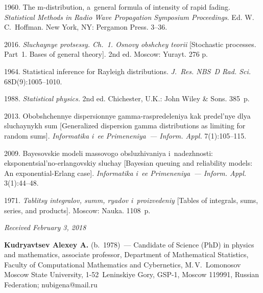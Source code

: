 \begin{multicols}{2}
{{\begin{thebibliography}{99}
 1960. The m-distribution, a~general formula of intensity of 
rapid fading. \textit{Statistical Methods in Radio Wave Propagation 
Symposium Proceedings}. Ed. W.\,C.~Hoffman. 
New York, NY: Pergamon Press. 3--36.

 2016. 
\textit{Sluchaynye protsessy. Ch.~1. Osnovy obshchey teorii} 
[Stochastic processes. Part~1. Bases of general theory].   
2nd ed.  Moscow: Yurayt. 276 p.

 1964. 
Statistical inference for Rayleigh distributions. 
\textit{J.~Res. NBS~D Rad. Sci.}
68D(9):1005--1010.

 1988. 
\textit{Statistical physics.} 2nd ed.  Chichester, U.K.: John Wiley \& Sons. 385~p.

 2013. 
Obobshchennye dispersionnye gamma-raspredeleniya kak predel'nye 
dlya sluchaynykh sum [Generalized dispersion gamma distributions 
as limiting for random sums]. 
\textit{Informatika i~ee Primeneniya~--- Inform. Appl.} 7(1):105--115.

 2009. 
Bayesovskie modeli massovogo obsluzhivaniya i~nadezhnosti: 
eksponentsial'no-erlangovskiy sluchay [Bayesian queuing and reliability models:
An exponential-Erlang case]. 
\textit{Informatika i~ee Primeneniya~--- Inform. Appl.} 3(1):44--48.

 1971. 
\textit{Tablitsy integralov, summ, ryadov i~proizvedeniy} 
[Tables of integrals, sums, series, and products]. Moscow: Nauka. 1108~p.
 \end{thebibliography}

 }
 }

\end{multicols}

\vspace*{-6pt}

\hfill{\small\textit{Received February 3, 2018}}



\Contrl

\noindent
\textbf{Kudryavtsev Alexey A.} (b.\ 1978)~--- 
Candidate of Science (PhD) in physics and mathematics, associate professor, 
Department of Mathematical Statistics, Faculty of Computational Mathematics 
and Cybernetics, M.\,V.~Lomonosov Moscow State University, 1-52~Leninskiye Gory, 
GSP-1, Moscow 119991, Russian Federation; \mbox{nubigena@mail.ru}
\label{end\stat}

\renewcommand{\bibname}{\protect\rm Литература}       